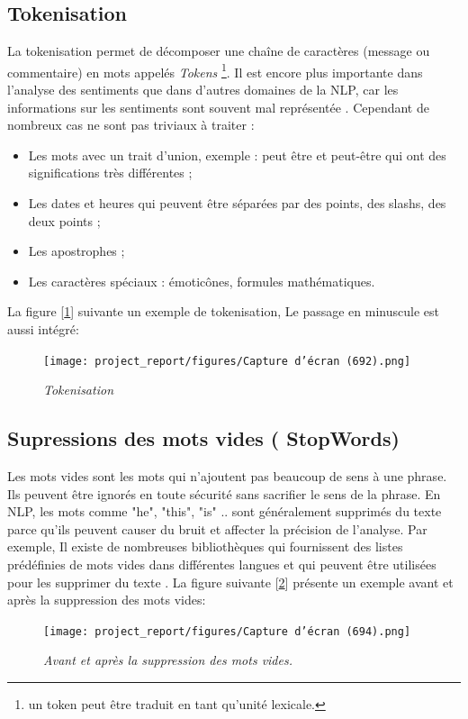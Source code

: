 \subsection{Tokenisation}
La tokenisation permet de décomposer une chaîne de caractères (message ou commentaire) en mots appelés \textit{Tokens }\footnote{un token peut être traduit en tant qu’unité lexicale.}.  Il est encore plus importante dans l’analyse des sentiments que dans d’autres domaines de la NLP, car les informations sur les sentiments sont souvent mal représentée \cite{singh2019nlp}. Cependant de nombreux cas ne sont pas triviaux à traiter \cite{coddity_nlp_blog} :
\begin{itemize}
    \item Les mots avec un trait d’union, exemple : peut être et peut-être qui ont des significations très différentes ;
    \item Les dates et heures qui peuvent être séparées par des points, des slashs, des deux points ;
    \item Les apostrophes ; 
    \item Les caractères spéciaux : émoticônes, formules mathématiques. 
\end{itemize}
La figure [\ref{fig:figureT}] suivante  un exemple de tokenisation, Le passage en minuscule est aussi 
intégré: 


\begin{figure}[h]
    \centering
    \texttt{[image: project\_report/figures/Capture d’écran (692).png]} 
    \caption{\textit{Tokenisation}} 
    \label{fig:figureT}
\end{figure}


\subsection{Supressions des mots vides ( StopWords)}
Les mots vides sont les mots qui n'ajoutent pas beaucoup de sens à une phrase. Ils peuvent être ignorés en toute sécurité sans sacrifier le sens de la phrase.  
En NLP, les mots comme "he", "this", "is" .. sont généralement supprimés du texte parce qu’ils peuvent causer du bruit et affecter la précision de l’analyse. Par exemple, Il existe de nombreuses bibliothèques qui fournissent des listes prédéfinies de mots vides dans différentes langues et qui peuvent être utilisées pour les supprimer du texte \cite{5degresNLP}. La figure suivante [\ref{fig:figureVIDE}] présente un exemple avant et après la suppression des mots vides:
\begin{figure}[h]
    \centering
    \texttt{[image: project\_report/figures/Capture d’écran (694).png]} 
    \caption{\textit{Avant et après la suppression des mots vides. }} 
    \label{fig:figureVIDE}
\end{figure}

